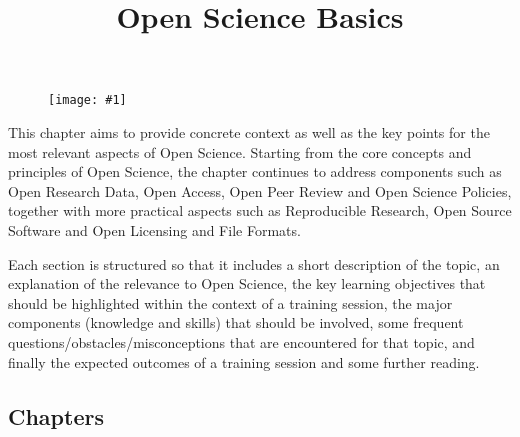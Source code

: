 \documentclass{article}
\newlength{\imgwidth}
\newcommand\scaledgraphics[2]{%
                
\settowidth{\imgwidth}{\texttt{[image: \#1]}}%
                
\setlength{\imgwidth}{\minof{\imgwidth}{#2\textwidth}}%
                
\texttt{[image: \#1]}%
                
}
\begin{document}
\title{Open Science Basics}

\maketitle

\begin{figure}
\scaledgraphics{7f8a81e8-98a1-4af0-8b77-ff24454ca171.png}{1}
\label{F42818491}
\end{figure}


This chapter aims to provide concrete context as well as the key points for the most relevant aspects of Open Science. Starting from the core concepts and principles of Open Science, the chapter continues to address components such as Open Research Data, Open Access, Open Peer Review and Open Science Policies, together with more practical aspects such as Reproducible Research, Open Source Software and Open Licensing and File Formats.


Each section is structured so that it includes a short description of the topic, an explanation of the relevance to Open Science, the key learning objectives that should be highlighted within the context of a training session, the major components (knowledge and skills) that should be involved, some frequent questions/obstacles/misconceptions that are encountered for that topic, and finally the expected outcomes of a training session and some further reading.


\subsection{Chapters}\label{chapters}
\end{document}
